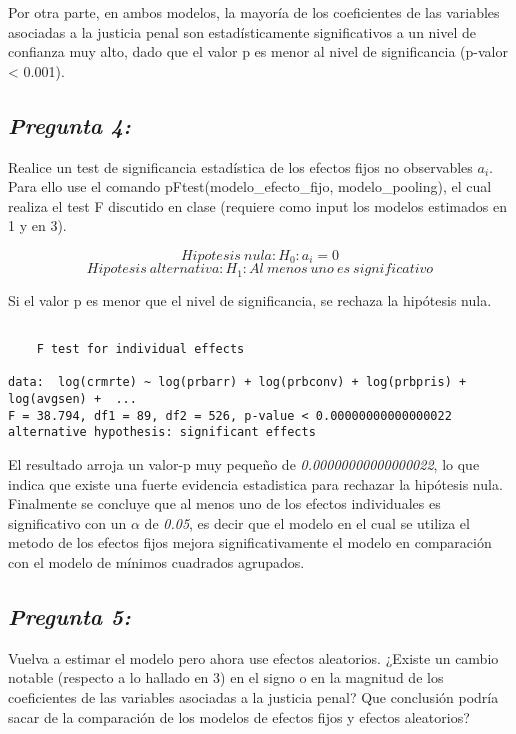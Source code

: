 \documentclass[
  12pt,
]{article}
\begin{document}
Por otra parte, en ambos modelos, la mayoría de los coeficientes de las
variables asociadas a la justicia penal son estadísticamente
significativos a un nivel de confianza muy alto, dado que el valor p es
menor al nivel de significancia (p-valor \textless{} 0.001).

\subsection{\texorpdfstring{\textbf{\emph{Pregunta
4:}}}{Pregunta 4:}}\label{pregunta-4}

Realice un test de significancia estadística de los efectos fijos no
observables \(a_i\). Para ello use el comando
pFtest(modelo\_efecto\_fijo, modelo\_pooling), el cual realiza el test F
discutido en clase (requiere como input los modelos estimados en 1 y en
3).

\[Hipotesis\ nula: H_0 : a_i = 0 \]
\[Hipotesis\ alternativa: H_1 : Al\ menos\ uno\ es\ significativo\]

Si el valor p es menor que el nivel de significancia, se rechaza la
hipótesis nula.

\begin{verbatim}

    F test for individual effects

data:  log(crmrte) ~ log(prbarr) + log(prbconv) + log(prbpris) + log(avgsen) +  ...
F = 38.794, df1 = 89, df2 = 526, p-value < 0.00000000000000022
alternative hypothesis: significant effects
\end{verbatim}

El resultado arroja un valor-p muy pequeño de
\emph{0.00000000000000022}, lo que indica que existe una fuerte
evidencia estadistica para rechazar la hipótesis nula. Finalmente se
concluye que al menos uno de los efectos individuales es significativo
con un \(\alpha\) de \emph{0.05}, es decir que el modelo en el cual se
utiliza el metodo de los efectos fijos mejora significativamente el
modelo en comparación con el modelo de mínimos cuadrados agrupados.

\subsection{\texorpdfstring{\textbf{\emph{Pregunta
5:}}}{Pregunta 5:}}\label{pregunta-5}

Vuelva a estimar el modelo pero ahora use efectos aleatorios. ¿Existe un
cambio notable (respecto a lo hallado en 3) en el signo o en la magnitud
de los coeficientes de las variables asociadas a la justicia penal? Que
conclusión podría sacar de la comparación de los modelos de efectos
fijos y efectos aleatorios?
\end{document}
